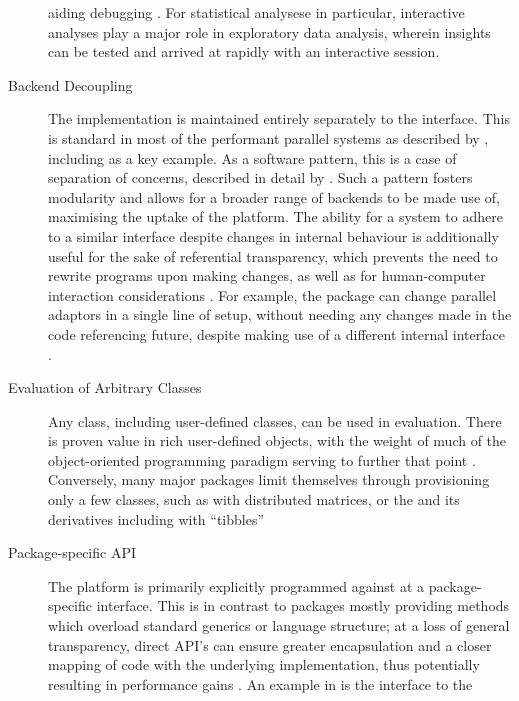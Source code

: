 \begin{description}
    aiding debugging \cite{mccarthy1978history}. For statistical analysese
    in particular, interactive analyses play a major role in exploratory
    data analysis, wherein insights can be tested and arrived at rapidly
    with an interactive session.
  \item[Backend Decoupling]
    The implementation is maintained entirely separately to the interface.
    This is standard in most of the performant parallel \R systems as
    described by \textcite{eddelbuettel2019parallel}, including  as a key
    example\cite{microsoft20}. As a software pattern, this is a case of
    separation of concerns, described in detail by \textcite{dijkstra1982role}.
    Such a pattern fosters modularity and allows for a broader range of
    backends to be made use of, maximising the uptake of the platform. The
    ability for a system to adhere to a similar interface despite changes in
    internal behaviour is additionally useful for the sake of referential
    transparency, which prevents the need to rewrite programs upon making
    changes, as well as for human-computer interaction considerations
    \cites{sondergaard1990Rtda,norman2013design}. For example, the 
    package can change parallel adaptors in a single line of setup, without
    needing any changes made in the code referencing future, despite making
    use of a different internal interface \cite{weston19:_using}.
  \item[Evaluation of Arbitrary Classes]
    Any class, including user-defined classes, can be used in evaluation.
    There is proven value in rich user-defined objects, with the weight of
    much of the object-oriented programming paradigm serving to further that
    point \cite{dahl2004simula}. Conversely, many major packages limit
    themselves through provisioning only a few classes, such as  with
    distributed matrices, or the  and its derivatives including
     with ``tibbles'' \cites{pbdDMATpackage,wickham2019welcome}
  \item[Package-specific API]
    The platform is primarily explicitly programmed against at a
    package-specific interface. This is in contrast to packages mostly
    providing methods which overload standard generics or language
    structure; at a loss of general transparency, direct API's can ensure
    greater encapsulation and a closer mapping of code with the underlying
    implementation, thus potentially resulting in performance gains
    \cite{bierhoff2009api}. An example in \R is the interface to the 

\end{description}
